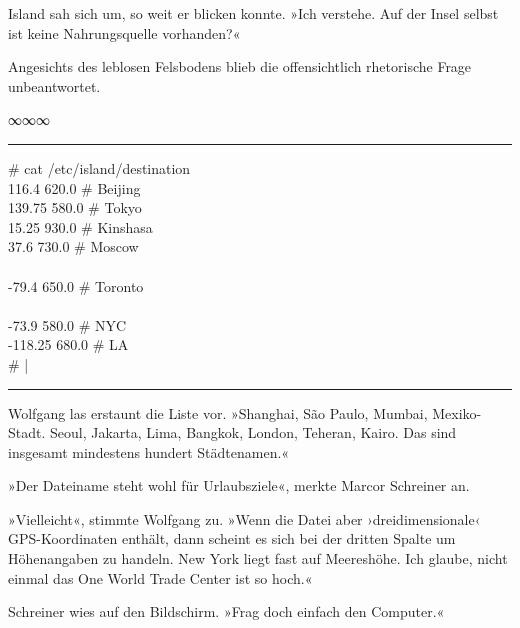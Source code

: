 Island sah sich um, so weit er blicken konnte. »Ich verstehe. Auf der Insel selbst ist keine Nahrungsquelle vorhanden?«

Angesichts des leblosen Felsbodens blieb die offensichtlich rhetorische Frage unbeantwortet.

\begin{center}
∞∞∞
\end{center}

\noindent \parbox{\textwidth}{ \vspace{3ex} \hrule \vspace{3ex}

    \begin{footnotesize}
    \begin{ttfamily}

\noindent \# cat /etc/island/destination\\
 116.4 620.0 \# Beijing\\
 139.75 580.0 \# Tokyo\\
 15.25 930.0 \# Kinshasa\\
 37.6 730.0 \# Moscow\\
\noindent […]\\
 -79.4 650.0 \# Toronto\\
\noindent […]\\
 -73.9 580.0 \# NYC\\
 -118.25 680.0 \# LA\\
\noindent \# |

    \end{ttfamily}
    \end{footnotesize}

\vspace{3ex} \hrule \vspace{3ex} }

Wolfgang las erstaunt die Liste vor. »Shanghai, São Paulo, Mumbai, Mexiko-Stadt. Seoul, Jakarta, Lima, Bangkok, London, Teheran, Kairo. Das sind insgesamt mindestens hundert Städtenamen.«

»Der Dateiname steht wohl für Urlaubsziele«, merkte Marcor Schreiner an.

»Vielleicht«, stimmte Wolfgang zu. »Wenn die Datei aber ›dreidimensionale‹ GPS-Koordinaten enthält, dann scheint es sich bei der dritten Spalte um Höhenangaben zu handeln. New York liegt fast auf Meereshöhe. Ich glaube, nicht einmal das One World Trade Center ist so hoch.«

Schreiner wies auf den Bildschirm. »Frag doch einfach den Computer.«

